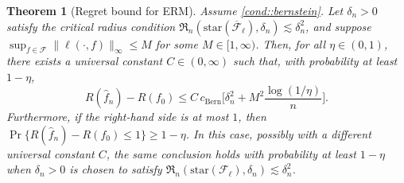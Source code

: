 \documentclass[10pt,a4paper]{amsart}
\newtheorem{theorem}{Theorem}
\begin{document}
\begin{theorem}[Regret bound for ERM]
\label{theorem:genregret}
Assume \ref{cond::bernstein}. Let \(\delta_n>0\) satisfy the critical radius condition
\(\mathfrak{R}_n(\mathrm{star}(\overline{\mathcal{F}}_{\ell}),\delta_n)\lesssim \delta_n^2\), and suppose
\(\sup_{f \in \mathcal{F}} \|\ell(\cdot, f)\|_{\infty} \leq M\) for some \(M \in [1, \infty)\).
Then, for all \(\eta \in (0, 1)\), there exists a universal constant
\(C\in(0,\infty)\) such that, with probability at least \(1-\eta\),
\[
R(\hat f_n)-R(f_0)
\le
C\,c_{\mathrm{Bern}}\Biggl[
\delta_n^2
+
M^2 \frac{\log(1/\eta)}{n}
\Biggr].
\]
Furthermore, if the right-hand side is at most \(1\), then
\(\Pr\{R(\hat f_n)-R(f_0)\le 1\}\ge 1-\eta\).
In this case, possibly with a different universal constant \(C\), the same conclusion holds
with probability at least \(1-\eta\) when \(\delta_n>0\) is chosen to satisfy
\(\mathfrak{R}_n(\mathrm{star}(\mathcal{F}_{\ell}),\delta_n)\lesssim \delta_n^2\).
\end{theorem}
\end{document}
